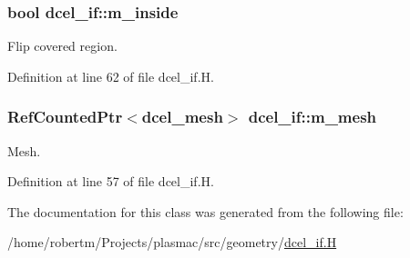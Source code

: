\subsubsection[{\texorpdfstring{m\+\_\+inside}{m_inside}}]{\setlength{\rightskip}{0pt plus 5cm}bool dcel\+\_\+if\+::m\+\_\+inside\hspace{0.3cm}{\ttfamily [protected]}}\hypertarget{classdcel__if_adffe63451c3eb9c9022c14251dd2e819}{}\label{classdcel__if_adffe63451c3eb9c9022c14251dd2e819}


Flip covered region. 



Definition at line 62 of file dcel\+\_\+if.\+H.

\subsubsection[{\texorpdfstring{m\+\_\+mesh}{m_mesh}}]{\setlength{\rightskip}{0pt plus 5cm}Ref\+Counted\+Ptr$<${\bf dcel\+\_\+mesh}$>$ dcel\+\_\+if\+::m\+\_\+mesh\hspace{0.3cm}{\ttfamily [protected]}}\hypertarget{classdcel__if_a0984d9e546a3c403add4ced0ec249e97}{}\label{classdcel__if_a0984d9e546a3c403add4ced0ec249e97}


Mesh. 



Definition at line 57 of file dcel\+\_\+if.\+H.



The documentation for this class was generated from the following file\+:\begin{DoxyCompactItemize}
\item 
/home/robertm/\+Projects/plasmac/src/geometry/\hyperlink{dcel__if_8H}{dcel\+\_\+if.\+H}\end{DoxyCompactItemize}
